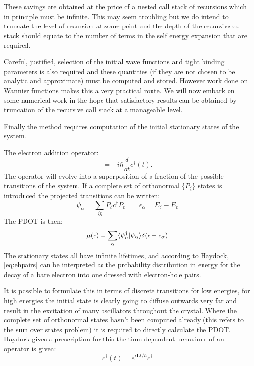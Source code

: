 These savings are obtained at the price of a nested call stack of recursions which 
in principle must be infinite. This may seem troubling but we do intend to truncate
the level of recursion at some point and the depth of the recursive call stack should
equate to the number of terms in the self energy expansion that are required.

	Careful, justified, selection of the initial wave functions and tight binding parameters
is also required and these quantities (if they are not chosen to be analytic and approximate)
must be computed and stored. However work done on Wannier functions makes this a very
practical route. We will now embark on some numerical work in the hope that satisfactory 
results can be obtained by truncation of the recursive call stack at a manageable level. 

Finally the method requires computation of the initial stationary states of the system.

The electron addition operator:
%
\begin{equation}
[H, c^{\dagger}(t)] = -i\hbar \frac{d}{dt} c^{\dagger}(t).
\end{equation}
%
The operator will evolve into a superposition of a fraction of the 
possible transitions of the system. If a complete set of orthonormal $\{P_{\zeta}\}$ 
states is introduced the projected transitions can be written:
%
\begin{equation}
\psi_{\alpha} = \sum_{\zeta\eta} P_{\zeta}c^{\dagger}P_{\eta} \qquad \epsilon_{\alpha} = E_{\zeta} - E_{\eta}
\end{equation}
%
The PDOT is then:
%
\begin{equation}
\label{eq:ehpairs}
\mu(\epsilon) = \sum_{\alpha} \langle\psi_{\alpha}^{\dagger}|\psi_{\alpha}\rangle \delta(\epsilon-\epsilon_{\alpha})
\end{equation}
%
The stationary states all have infinite lifetimes, and according to Haydock, \ref{eq:ehpairs} can
be interpreted as the probability distribution in energy for the decay of a bare electron into one dressed
with electron-hole pairs.

It is possible to formulate this in terms of discrete transitions for low energies, for high energies
the initial state is clearly going to diffuse outwards very far and result in the excitation of 
many oscillators throughout the crystal. Where the complete set of orthonormal states
hasn't been computed already (this refers to the sum over states problem) it is required to directly
calculate the PDOT. Haydock gives a prescription for this the time dependent behaviour of
an operator is given:
%
\begin{equation}
\label{eq:creationt}
c^{\dagger}(t) = e^{i\mathbf{L}t/\hbar} c^{\dagger}
\end{equation}
%


